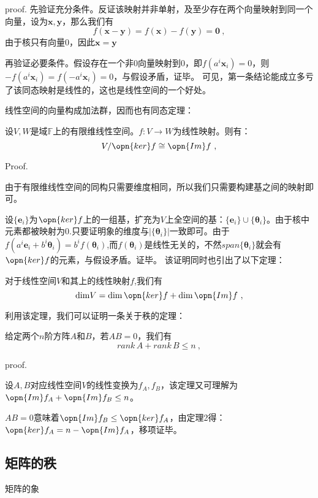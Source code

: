 proof.
先验证充分条件。反证该映射并非单射，及至少存在两个向量映射到同一个向量，设为$\boldsymbol{x,y}$，那么我们有
\begin{equation}
f(\boldsymbol{x}-\boldsymbol{y})=f(\boldsymbol x)-f(\boldsymbol y)=\boldsymbol 0~,
\end{equation}
由于核只有向量$0$，因此$\boldsymbol {x}=\boldsymbol{y}$

再验证必要条件。假设存在一个非$0$向量映射到$0$，即$f(a^i\boldsymbol x_i)=0$，则$-f(a^i\boldsymbol x_i)=f(-a^i\boldsymbol x_i)=0$，与假设矛盾，证毕。
可见，第一条结论能成立多亏了该同态映射是线性的，这也是线性空间的一个好处。

线性空间的向量构成加法群，因而也有同态定理：
\begin{theorem}{}
设$V,W$是域$\mathbb F$上的有限维线性空间。$f:V\rightarrow W$为线性映射。则有：
\begin{equation}
V/\opn{ker}f\cong \opn{Im} f~,
\end{equation}
\end{theorem}
Proof.

由于有限维线性空间的同构只需要维度相同，所以我们只需要构建基之间的映射即可。

设$\{\boldsymbol e_i\}$为$\opn{ker}f$上的一组基，扩充为$V$上全空间的基：$\{\boldsymbol e_i\}\cup \{\boldsymbol \theta_i\}$。由于核中元素都被映射为0.只要证明象的维度与$|\{\boldsymbol \theta_i\}|$一致即可。由于$f(a^i\boldsymbol e_i+b^i\boldsymbol \theta_i)=b^if(\boldsymbol \theta_i)$,而$f(\boldsymbol \theta_i)$是线性无关的，不然$span\{\boldsymbol \theta_i\}$就会有$\opn{ker}f$的元素，与假设矛盾。证毕。
该证明同时也引出了以下定理：
\begin{lemma}{}
对于线性空间$V$和其上的线性映射$f$,我们有
\begin{equation}
\mathrm{dim}V=\mathrm{dim}\,\opn{ker}f+\mathrm {dim}\,\opn{Im}f~,
\end{equation}
\end{lemma}
利用该定理，我们可以证明一条关于秩的定理：
\begin{theorem}{}
给定两个$n$阶方阵$A$和$B$，若$AB=0$，我们有
\begin{equation}
rank\,A+rank\,B\le n~,
\end{equation}
\end{theorem}
proof.

设$A,B$对应线性空间$V$的线性变换为$f_A,f_B$，该定理又可理解为$\opn{Im}f_A+\opn{Im}f_B\le n$。

$AB=0$意味着$\opn{Im}f_B\le \opn{ker}f_A$，由定理2得：$\opn{ker}f_A=n-\opn{Im}f_A$，移项证毕。
\subsection{矩阵的秩}
矩阵的象